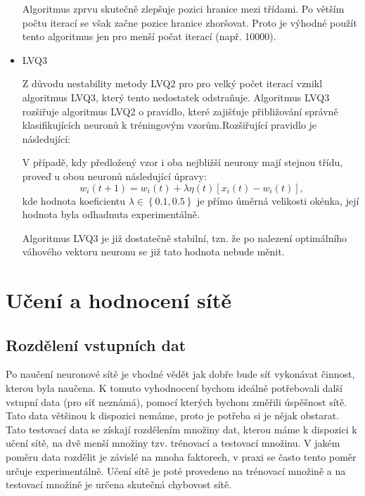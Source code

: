 \documentclass[11pt,twoside,a4paper]{book}
\begin{document}
\begin{itemize}
Algoritmus zprvu skutečně zlepšuje pozici hranice mezi třídami. Po větším počtu iterací se však začne pozice hranice zhoršovat. Proto je výhodné použít tento algoritmus jen pro menší počat iterací (např. 10000)\cite{courseware}.
\item LVQ3

Z důvodu nestability metody LVQ2 pro pro velký počet iterací vznikl algoritmus LVQ3, který tento nedostatek odstraňuje. Algoritmus LVQ3 rozšiřuje algoritmus LVQ2 o pravidlo, které zajišťuje přibližování správně klasifikujících neuronů k tréningovým vzorům.Rozšiřující pravidlo je následující:

V případě, kdy předložený vzor i oba nejbližší neurony mají stejnou třídu, proveď u obou neuronů následující úpravy:
\begin{equation}
w_{i}(t+1)=w_{i}(t)+\lambda \eta(t)\left[x_{i}(t)-w_{i}(t)\right]\mbox{,}
\end{equation}
kde hodnota koeficientu $\lambda\in\left\lbrace0.1,0.5\right\rbrace$ je přímo úměrná velikosti okénka, její hodnota byla odhadnuta experimentálně.\cite{skripta}

Algoritmus LVQ3 je již dostatečně stabilní, tzn. že po nalezení optimálního váhového vektoru neuronu se již tato hodnota nebude měnit.
\end{itemize}
\chapter{Učení a hodnocení sítě}
\section{Rozdělení vstupních dat}
Po naučení neuronové sítě je vhodné vědět jak dobře bude síť vykonávat činnost, kterou byla naučena. K tomuto vyhodnocení bychom ideálně potřebovali další vstupní data (pro síť neznámá), pomocí kterých bychom změřili úspěšnost sítě. Tato data většinou k dispozici nemáme, proto je potřeba si je nějak obstarat. Tato testovací data se získají rozdělením množiny dat, kterou máme k dispozici k učení sítě, na dvě menší množiny tzv. trénovací a testovací množinu. V jakém poměru data rozdělit je závislé na mnoha faktorech, v praxi se často tento poměr určuje experimentálně. Učení sítě je poté provedeno na trénovací množině a na testovací množině je určena skutečná chybovost sítě.
\end{document}
